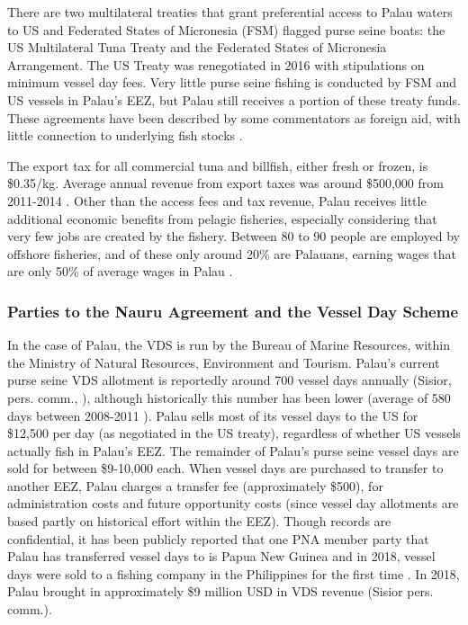 \documentclass[9p,twocolumn,twoside,lineno]{pnas-new}
\begin{document}
There are two multilateral treaties that grant preferential access to Palau waters to US and Federated States of Micronesia (FSM) flagged purse seine boats: the US Multilateral Tuna Treaty and the Federated States of Micronesia Arrangement.  The US Treaty was renegotiated in 2016 with stipulations on minimum vessel day fees. Very little purse seine fishing is conducted by FSM and US vessels in Palau’s EEZ, but Palau still receives a portion of these treaty funds. These agreements have been described by some commentators as foreign aid, with little connection to underlying fish stocks \cite{Gillett2016}. 

The export tax for all commercial tuna and billfish, either fresh or frozen, is \$0.35/kg. Average annual revenue from export taxes was around \$500,000 from 2011-2014 \citep{Gillett2016}. 
Other than the access fees and tax revenue, Palau receives little additional economic benefits from pelagic fisheries, especially considering that very few jobs are created by the fishery. Between 80 to 90 people are employed by offshore fisheries, and of these only around 20\% are Palauans, earning wages that are only 50\% of average wages in Palau \cite{Gillett2016}.

\subsubsection{Parties to the Nauru Agreement and the Vessel Day Scheme}

In the case of Palau, the VDS is run by the Bureau of Marine Resources, within the Ministry of Natural Resources, Environment and Tourism. Palau’s current purse seine VDS allotment is reportedly around 700 vessel days annually (Sisior, pers. comm., \cite{Pojas2018}), although historically this number has been lower (average of 580 days between 2008-2011 \citep{Tewid2013}). Palau sells most of its vessel days to the US for \$12,500 per day (as negotiated in the US treaty), regardless of whether US vessels actually fish in Palau’s EEZ. The remainder of Palau’s purse seine vessel days are sold for between \$9-10,000 each. When vessel days are purchased to transfer to another EEZ, Palau charges a transfer fee (approximately \$500), for administration costs and future opportunity costs (since vessel day allotments are based partly on historical effort within the EEZ). Though records are confidential, it has been publicly reported that one PNA member party that Palau has transferred vessel days to is Papua New Guinea \citep{Tewid2013} and in 2018, vessel days were sold to a fishing company in the Philippines for the first time \citep{Pojas2018}. In 2018, Palau brought in approximately \$9 million USD in VDS revenue (Sisior pers. comm.). 
\end{document}
